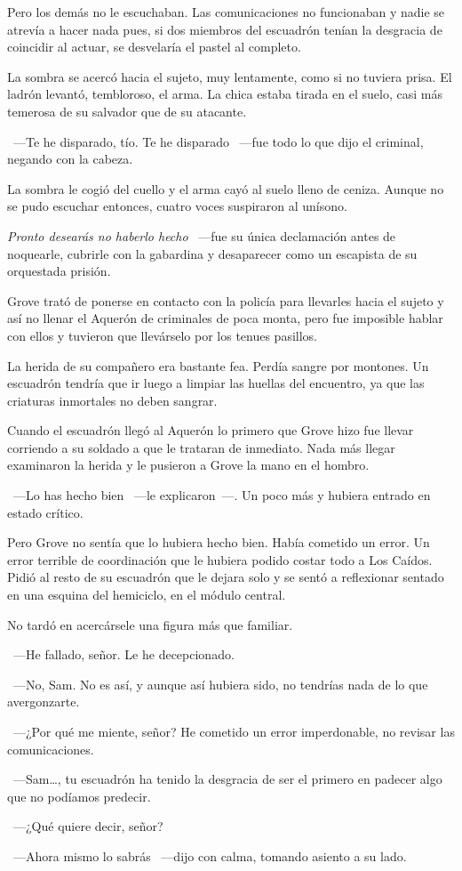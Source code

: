 Pero los demás no le escuchaban. Las comunicaciones no funcionaban y nadie se atrevía a hacer nada pues, si dos miembros del escuadrón tenían la desgracia de coincidir al actuar, se desvelaría el pastel al completo.

La sombra se acercó hacia el sujeto, muy lentamente, como si no tuviera prisa. El ladrón levantó, tembloroso, el arma. La chica estaba tirada en el suelo, casi más temerosa de su salvador que de su atacante.

~---Te he disparado, tío. Te he disparado ~---fue todo lo que dijo el criminal, negando con la cabeza.

La sombra le cogió del cuello y el arma cayó al suelo lleno de ceniza. Aunque no se pudo escuchar entonces, cuatro voces suspiraron al unísono.

\emph{Pronto desearás no haberlo hecho} ~---fue su única declamación antes de noquearle, cubrirle con la gabardina y desaparecer como un escapista de su orquestada prisión.

Grove trató de ponerse en contacto con la policía para llevarles hacia el sujeto y así no llenar el Aquerón de criminales de poca monta, pero fue imposible hablar con ellos y tuvieron que llevárselo por los tenues pasillos.

La herida de su compañero era bastante fea. Perdía sangre por montones. Un escuadrón tendría que ir luego a limpiar las huellas del encuentro, ya que las criaturas inmortales no deben sangrar.

Cuando el escuadrón llegó al Aquerón lo primero que Grove hizo fue llevar corriendo a su soldado a que le trataran de inmediato. Nada más llegar examinaron la herida y le pusieron a Grove la mano en el hombro.

~---Lo has hecho bien ~---le explicaron~---. Un poco más y hubiera entrado en estado crítico.

Pero Grove no sentía que lo hubiera hecho bien. Había cometido un error. Un error terrible de coordinación que le hubiera podido costar todo a Los Caídos. Pidió al resto de su escuadrón que le dejara solo y se sentó a reflexionar sentado en una esquina del hemiciclo, en el módulo central.

No tardó en acercársele una figura más que familiar.

~---He fallado, señor. Le he decepcionado.

~---No, Sam. No es así, y aunque así hubiera sido, no tendrías nada de lo que avergonzarte.

~---¿Por qué me miente, señor? He cometido un error imperdonable, no revisar las comunicaciones.

~---Sam\dots, tu escuadrón ha tenido la desgracia de ser el primero en padecer algo que no podíamos predecir.

~---¿Qué quiere decir, señor?

~---Ahora mismo lo sabrás ~---dijo con calma, tomando asiento a su lado.

\endinput
